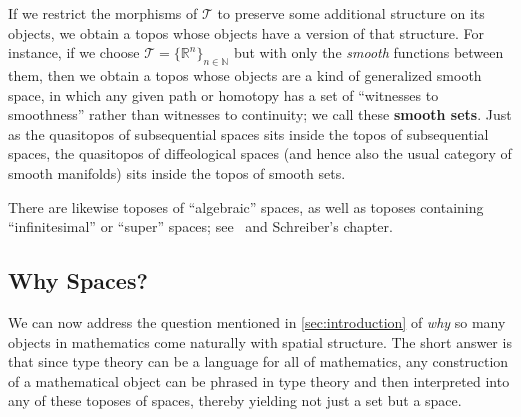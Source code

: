 \documentclass[12pt]{article}
\def\N{\mathbb{N}}
\def\R{\mathbb{R}}
\def\T{\mathcal{T}}
\numberwithin{equation}{section}
\begin{document}
If we restrict the morphisms of $\T$ to preserve some additional structure on its objects, we obtain a topos whose objects have a version of that structure.
For instance, if we choose $\T = \{\R^n\}_{n\in \N}$ but with only the \emph{smooth} functions between them, then we obtain a topos whose objects are a kind of generalized smooth space, in which any given path or homotopy has a set of ``witnesses to smoothness'' rather than witnesses to continuity; we call these \textbf{smooth sets}.
Just as the quasitopos of subsequential spaces sits inside the topos of subsequential spaces, the quasitopos of diffeological spaces (and hence also the usual category of smooth manifolds) sits inside the topos of smooth sets.

There are likewise toposes of ``algebraic'' spaces, as well as toposes containing ``infinitesimal'' or ``super'' spaces; see~\cite{bh:cc-smooth,moerdijk-reyes:sia} and Schreiber's chapter.

\subsection{Why Spaces?}
\label{sec:why-spaces}

We can now address the question mentioned in \cref{sec:introduction} of \emph{why} so many objects in mathematics come naturally with spatial structure.
The short answer is that since type theory can be a language for all of mathematics, any construction of a mathematical object can be phrased in type theory and then interpreted into any of these toposes of spaces, thereby yielding not just a set but a space.
%
%
%
\end{document}
